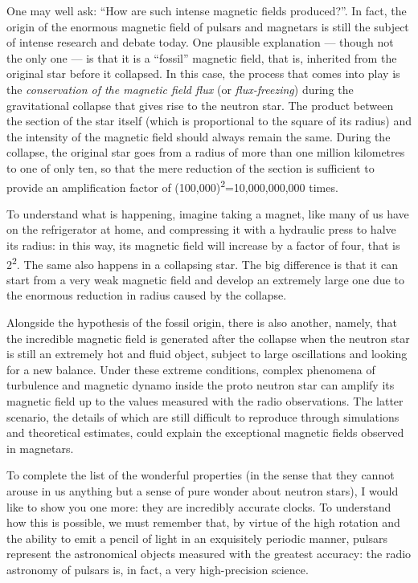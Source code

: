 One may well ask: ``How are such intense magnetic fields produced?''. In fact, the
origin of the enormous magnetic field of pulsars and
magnetars is still the subject of intense research and debate today.
One plausible explanation --- though not the only one --- is that it is a ``fossil''
magnetic field, that is, inherited from the original star before it collapsed. In this
case, the process that comes into play is the \emph{conservation of the magnetic field
flux} (or \emph{flux-freezing}) during the gravitational
collapse that gives rise to the neutron star. The product between the
section of the star itself (which is proportional to the square of its radius) and the
intensity of the magnetic field should always remain the same. During the
collapse, the original star goes from a radius of more than one
million kilometres to one of only ten, so that the mere reduction of the section is
sufficient to provide an amplification factor of
(100,000)\textsuperscript{2}=10,000,000,000 times.

To understand what is happening, imagine taking a magnet, like many of us have on the
refrigerator at home, and compressing it with a hydraulic press to halve its radius: in
this way, its magnetic field will increase by a factor of four, that is
2\textsuperscript{2}. The same also happens in a collapsing star. The big difference is
that it can start from a very weak magnetic field and develop an extremely large one due
to the enormous reduction in radius caused by the collapse.

Alongside the hypothesis of the fossil origin, there is also another, namely, that the
incredible magnetic field is generated after the collapse when the neutron star is still
an extremely hot and fluid object, subject to large oscillations and
looking for a new balance. Under these extreme conditions, complex phenomena of
turbulence and magnetic dynamo inside the proto neutron star can
amplify its magnetic field up to the values measured with the radio observations. The
latter scenario, the details of which are still difficult to reproduce through
simulations and theoretical estimates, could explain the exceptional magnetic fields
observed in magnetars.

To complete the list of the wonderful properties (in the sense that they cannot arouse
in us anything but a sense of pure wonder about neutron stars), I would like to show you
one more: they are incredibly accurate clocks. To understand how this is possible, we
must remember that, by virtue of the high rotation and the ability to emit a pencil of
light in an exquisitely periodic manner, pulsars represent the astronomical objects
measured with the greatest accuracy: the radio astronomy of pulsars is, in fact, a very
high-precision science.

